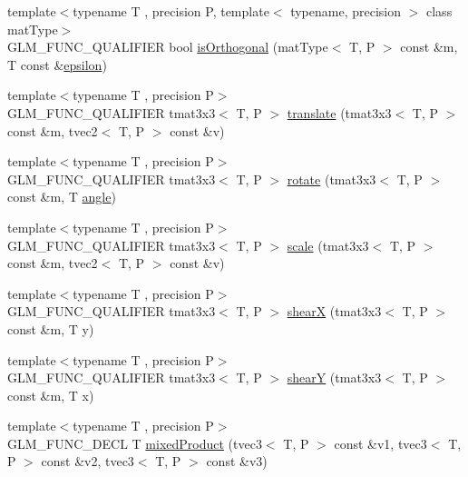 \begin{DoxyCompactItemize}
\item 
{\footnotesize template$<$typename T , precision P, template$<$ typename, precision $>$ class mat\+Type$>$ }\\G\+L\+M\+\_\+\+F\+U\+N\+C\+\_\+\+Q\+U\+A\+L\+I\+F\+I\+E\+R bool \hyperlink{group__gtx__matrix__query_gab2cb5d23df77b4e4e63ad2965acd31b3}{is\+Orthogonal} (mat\+Type$<$ T, P $>$ const \&m, T const \&\hyperlink{group__gtc__constants_ga2a1e57fc5592b69cfae84174cbfc9429}{epsilon})
\item 
{\footnotesize template$<$typename T , precision P$>$ }\\G\+L\+M\+\_\+\+F\+U\+N\+C\+\_\+\+Q\+U\+A\+L\+I\+F\+I\+E\+R tmat3x3$<$ T, P $>$ \hyperlink{group__gtx__matrix__transform__2d_ga3786656ac137084ef73151636eff44d8}{translate} (tmat3x3$<$ T, P $>$ const \&m, tvec2$<$ T, P $>$ const \&v)
\item 
{\footnotesize template$<$typename T , precision P$>$ }\\G\+L\+M\+\_\+\+F\+U\+N\+C\+\_\+\+Q\+U\+A\+L\+I\+F\+I\+E\+R tmat3x3$<$ T, P $>$ \hyperlink{group__gtx__matrix__transform__2d_ga23ec870ee4b75d85cc021e0fd1532b48}{rotate} (tmat3x3$<$ T, P $>$ const \&m, T \hyperlink{group__gtc__quaternion_gad4a4448baedb198b2b1e7880d2544dc9}{angle})
\item 
{\footnotesize template$<$typename T , precision P$>$ }\\G\+L\+M\+\_\+\+F\+U\+N\+C\+\_\+\+Q\+U\+A\+L\+I\+F\+I\+E\+R tmat3x3$<$ T, P $>$ \hyperlink{group__gtx__matrix__transform__2d_gadb9f2a729d399ae5e9c33eb64d0d66fe}{scale} (tmat3x3$<$ T, P $>$ const \&m, tvec2$<$ T, P $>$ const \&v)
\item 
{\footnotesize template$<$typename T , precision P$>$ }\\G\+L\+M\+\_\+\+F\+U\+N\+C\+\_\+\+Q\+U\+A\+L\+I\+F\+I\+E\+R tmat3x3$<$ T, P $>$ \hyperlink{group__gtx__matrix__transform__2d_gab3363478cb625e40c5bd924fd838cf54}{shear\+X} (tmat3x3$<$ T, P $>$ const \&m, T y)
\item 
{\footnotesize template$<$typename T , precision P$>$ }\\G\+L\+M\+\_\+\+F\+U\+N\+C\+\_\+\+Q\+U\+A\+L\+I\+F\+I\+E\+R tmat3x3$<$ T, P $>$ \hyperlink{group__gtx__matrix__transform__2d_ga69bfb47d250df7464a5b14f2b95a9b4a}{shear\+Y} (tmat3x3$<$ T, P $>$ const \&m, T x)
\item 
{\footnotesize template$<$typename T , precision P$>$ }\\G\+L\+M\+\_\+\+F\+U\+N\+C\+\_\+\+D\+E\+C\+L T \hyperlink{group__gtx__mixed__product_gaaee4cf80d69cb86de80f12af88b3c3af}{mixed\+Product} (tvec3$<$ T, P $>$ const \&v1, tvec3$<$ T, P $>$ const \&v2, tvec3$<$ T, P $>$ const \&v3)

\end{DoxyCompactItemize}
